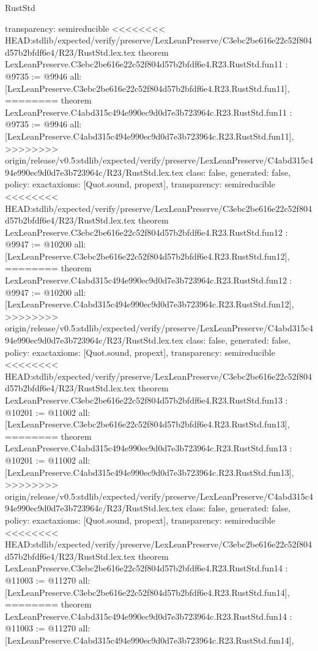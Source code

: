 \begin{lexlean}{RustStd}
\begin{coremodule}
{\begin{coremodule}
{{{{{{{{{{{{{{  transparency: semireducible
}
<<<<<<<< HEAD:stdlib/expected/verify/preserve/LexLeanPreserve/C3ebc2be616e22c52f804d57b2bfdf6e4/R23/RustStd.lex.tex
theorem LexLeanPreserve.C3ebc2be616e22c52f804d57b2bfdf6e4.R23.RustStd.fun11 : @9735 := @9946 {
  all: [LexLeanPreserve.C3ebc2be616e22c52f804d57b2bfdf6e4.R23.RustStd.fun11],
========
theorem LexLeanPreserve.C4abd315c494e990ec9d0d7e3b723964c.R23.RustStd.fun11 : @9735 := @9946 {
  all: [LexLeanPreserve.C4abd315c494e990ec9d0d7e3b723964c.R23.RustStd.fun11],
>>>>>>>> origin/release/v0.5:stdlib/expected/verify/preserve/LexLeanPreserve/C4abd315c494e990ec9d0d7e3b723964c/R23/RustStd.lex.tex
  class: false,
  generated: false,
  policy: exact{axioms: [Quot.sound, propext]},
  transparency: semireducible
}
<<<<<<<< HEAD:stdlib/expected/verify/preserve/LexLeanPreserve/C3ebc2be616e22c52f804d57b2bfdf6e4/R23/RustStd.lex.tex
theorem LexLeanPreserve.C3ebc2be616e22c52f804d57b2bfdf6e4.R23.RustStd.fun12 : @9947 := @10200 {
  all: [LexLeanPreserve.C3ebc2be616e22c52f804d57b2bfdf6e4.R23.RustStd.fun12],
========
theorem LexLeanPreserve.C4abd315c494e990ec9d0d7e3b723964c.R23.RustStd.fun12 : @9947 := @10200 {
  all: [LexLeanPreserve.C4abd315c494e990ec9d0d7e3b723964c.R23.RustStd.fun12],
>>>>>>>> origin/release/v0.5:stdlib/expected/verify/preserve/LexLeanPreserve/C4abd315c494e990ec9d0d7e3b723964c/R23/RustStd.lex.tex
  class: false,
  generated: false,
  policy: exact{axioms: [Quot.sound, propext]},
  transparency: semireducible
}
<<<<<<<< HEAD:stdlib/expected/verify/preserve/LexLeanPreserve/C3ebc2be616e22c52f804d57b2bfdf6e4/R23/RustStd.lex.tex
theorem LexLeanPreserve.C3ebc2be616e22c52f804d57b2bfdf6e4.R23.RustStd.fun13 : @10201 := @11002 {
  all: [LexLeanPreserve.C3ebc2be616e22c52f804d57b2bfdf6e4.R23.RustStd.fun13],
========
theorem LexLeanPreserve.C4abd315c494e990ec9d0d7e3b723964c.R23.RustStd.fun13 : @10201 := @11002 {
  all: [LexLeanPreserve.C4abd315c494e990ec9d0d7e3b723964c.R23.RustStd.fun13],
>>>>>>>> origin/release/v0.5:stdlib/expected/verify/preserve/LexLeanPreserve/C4abd315c494e990ec9d0d7e3b723964c/R23/RustStd.lex.tex
  class: false,
  generated: false,
  policy: exact{axioms: [Quot.sound, propext]},
  transparency: semireducible
}
<<<<<<<< HEAD:stdlib/expected/verify/preserve/LexLeanPreserve/C3ebc2be616e22c52f804d57b2bfdf6e4/R23/RustStd.lex.tex
theorem LexLeanPreserve.C3ebc2be616e22c52f804d57b2bfdf6e4.R23.RustStd.fun14 : @11003 := @11270 {
  all: [LexLeanPreserve.C3ebc2be616e22c52f804d57b2bfdf6e4.R23.RustStd.fun14],
========
theorem LexLeanPreserve.C4abd315c494e990ec9d0d7e3b723964c.R23.RustStd.fun14 : @11003 := @11270 {
  all: [LexLeanPreserve.C4abd315c494e990ec9d0d7e3b723964c.R23.RustStd.fun14],
}}}}}}}}}}}}}}}}}}
\end{coremodule}}
\end{coremodule}
\end{lexlean}
